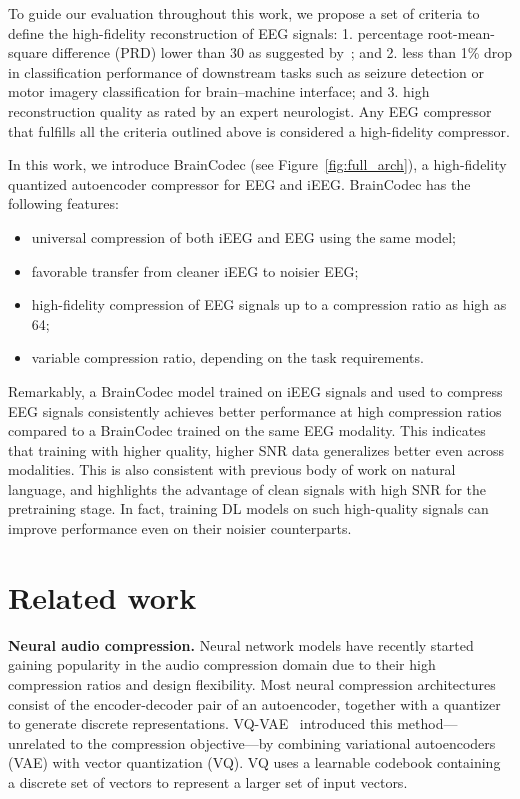\documentclass{article} %
\begin{document}
To guide our evaluation throughout this work, we propose a set of criteria to define the high-fidelity reconstruction of EEG signals: 1. percentage root-mean-square difference (PRD) lower than 30 as suggested by~\citet{Higgins2010}; and 2. less than 1\% drop in classification performance of downstream tasks such as seizure detection or motor imagery classification for brain--machine interface; and 3. high reconstruction quality as rated by an expert neurologist.
Any EEG compressor that fulfills all the criteria outlined above is considered a high-fidelity compressor.

In this work, we introduce BrainCodec (see Figure~\ref{fig:full_arch}), a high-fidelity quantized autoencoder compressor for EEG and iEEG. BrainCodec has the following features:
\begin{itemize}
    \item universal compression of both iEEG and EEG using the same model;
    \item favorable transfer from cleaner iEEG to noisier EEG;
    \item high-fidelity compression of EEG signals up to a compression ratio as high as 64;
    \item variable compression ratio, depending on the task requirements.
\end{itemize}
Remarkably, a BrainCodec model trained on iEEG signals and used to compress EEG signals consistently achieves better performance at high compression ratios compared to a BrainCodec trained on the same EEG modality. 
This indicates that training with higher quality, higher SNR data generalizes better even across modalities.
This is also consistent with previous body of work on natural language, and highlights the advantage of clean signals with high SNR for the pretraining stage.
In fact, training DL models on such high-quality signals can improve performance even on their noisier counterparts.












\section{Related work}

\textbf{Neural audio compression.} 
Neural network models have recently started gaining popularity in the audio compression domain due to their high compression ratios and design flexibility. Most neural compression architectures consist of the encoder-decoder pair of an autoencoder, together with a quantizer to generate discrete representations. VQ-VAE~\citep{VanDenOord2017} introduced this method---unrelated to the compression objective---by combining variational autoencoders (VAE) with vector quantization (VQ). VQ uses a learnable codebook containing a discrete set of vectors to represent a larger set of input vectors.
\end{document}
